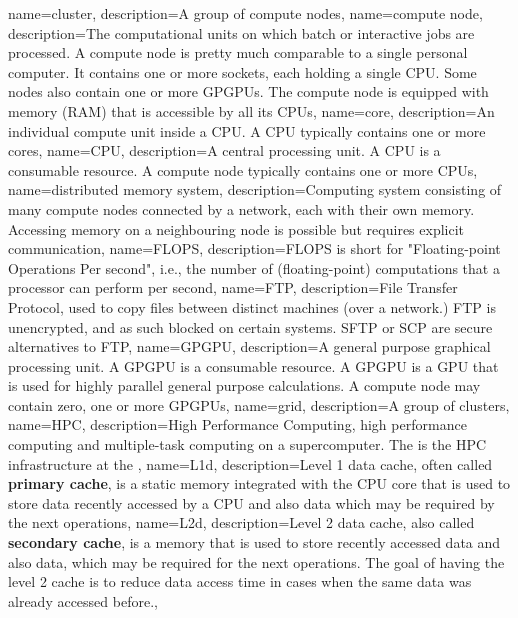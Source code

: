 {
  name={cluster},
  description={A group of compute nodes},
}
{
  name={compute node},
  description={The computational units on which batch or interactive jobs are processed. A compute node is pretty much comparable to a single personal computer. It contains one or more sockets, each holding a single CPU. Some nodes also contain one or more GPGPUs. The compute node is equipped with memory (RAM) that is accessible by all its CPUs},
}
{
  name={core},
  description={An individual compute unit inside a CPU. A CPU typically contains one or more cores},
}
{
  name={CPU},
  description={A central processing unit. A CPU is a consumable resource. A compute node typically contains one or more CPUs},
}
{
  name={distributed memory system},
  description={Computing system consisting of many compute nodes connected by a network, each with their own memory. Accessing memory on a neighbouring node is possible but requires explicit communication},
}
{
  name={FLOPS},
  description={FLOPS is short for "Floating-point Operations Per second", i.e., the number of (floating-point) computations that a processor can perform per second},
}
{
  name={FTP},
  description={File Transfer Protocol, used to copy files between distinct machines (over a network.) FTP is unencrypted, and as such blocked on certain systems. SFTP or SCP are secure alternatives to FTP},
}
{
  name={GPGPU},
  description={A general purpose graphical processing unit. A GPGPU is a consumable resource. A GPGPU is a GPU that is used for highly parallel general purpose calculations. A compute node may contain zero, one or more GPGPUs},
}
{
  name={grid},
  description={A group of clusters},
}
{
  name={HPC},
  description={High Performance Computing, high performance computing and multiple-task computing on a supercomputer. The \hpcInfra is the HPC infrastructure at the \university},
}
{
  name={L1d},
  description={Level 1 data cache, often called \textbf{primary cache}, is a static memory integrated with the CPU core that is used to store data recently accessed by a CPU and also data which may be required by the next operations},
}
{
  name={L2d},
  description={Level 2 data cache, also called \textbf{secondary cache}, is a memory that is used to store recently accessed data and also data, which may be required for the next operations. The goal of having the level 2 cache is to reduce data access time in cases when the same data was already accessed before.},
}
